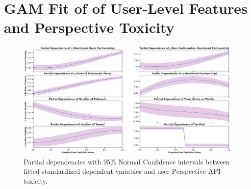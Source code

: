 \section{GAM Fit of of User-Level Features and Perspective Toxicity\label{sec:perspective-user-app}}
\begin{figure}[!h]
\begin{minipage}[l]{1.0\textwidth}
\includegraphics[width=1\columnwidth]{figures/partial_dependence_important_variables-perspective.pdf} 
\end{minipage}
\begin{minipage}[l]{1\textwidth}
\caption{Partial dependencies with 95\% Normal Confidence intervals between fitted standardized dependent variables and user Perspective API toxicity.}
\end{minipage}

\end{figure}

